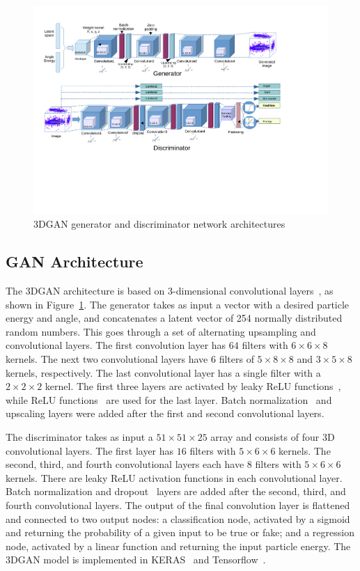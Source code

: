 \begin{figure}[htbp]
\centering
    \includegraphics[scale=0.65, trim={0cm 6cm 3.5cm 1.8cm}]{Images/Calo/gan_model_alt_upsampling.pdf}
    \caption{3DGAN generator and discriminator network architectures}
    \label{fig:GAN_arch}
\end{figure}

\subsection*{GAN Architecture}
\label{sec:GANarch}

The 3DGAN architecture is based on 3-dimensional convolutional layers~\cite{conv}, as shown in Figure~\ref{fig:GAN_arch}. The generator takes as input a vector with a desired particle energy and angle, and concatenates a latent vector of 254 normally distributed random numbers. This goes through a set of alternating upsampling and convolutional layers. The first convolution layer has $64$ filters with $6 \times 6 \times 8$ kernels. The next two convolutional layers have $6$ filters of $5 \times 8 \times 8$ and $3 \times 5 \times 8$ kernels, respectively. The last convolutional layer has a single filter with a $2 \times 2 \times 2$ kernel. The first three layers are activated by leaky ReLU functions~\cite{LeakyReLU}, while ReLU functions~\cite{ReLU} are used for the last layer. Batch normalization~\cite{batchnorm} and upscaling layers were added after the first and second convolutional layers.

The discriminator takes as input a $51  \times 51  \times 25$ array and consists of four 3D convolutional layers. The first layer has $16$ filters with $5 \times 6 \times 6$ kernels. The second, third, and fourth convolutional layers each have $8$ filters with $5 \times 6 \times 6$ kernels. There are leaky ReLU activation functions in each convolutional layer. Batch normalization and dropout~\cite{dropout} layers are added after the second, third, and fourth convolutional layers. The output of the final convolution layer is flattened and connected to two output nodes: a classification node, activated by a sigmoid and returning the probability of a given input to be true or fake; and a regression node, activated by a linear function and returning the input particle energy.
The 3DGAN model is implemented in KERAS~\cite{keras} and Tensorflow~\cite{tensorflow2015-whitepaper}.

